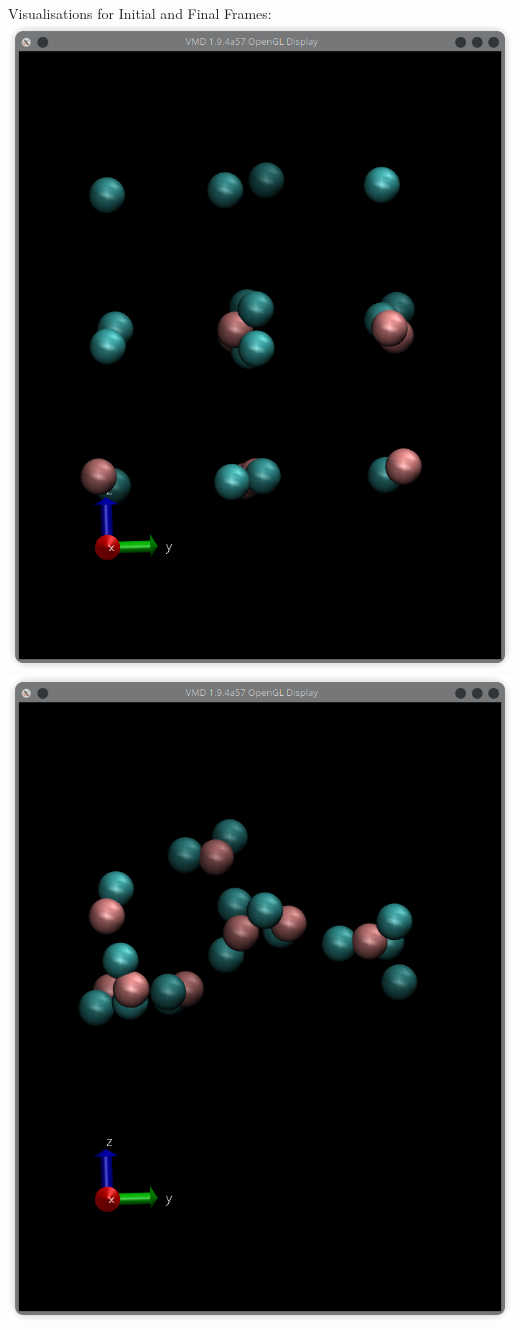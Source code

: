 \documentclass[11pt]{article}
\begin{document}
Visualisations for Initial and Final Frames: \\
\includegraphics[scale=0.5]{Q3a_FF.png} \includegraphics[scale=0.5]{Q3a_LF.png}
\end{document}
